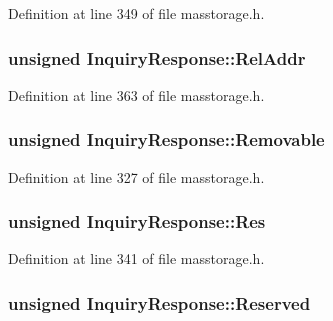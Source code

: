 \-Definition at line 349 of file masstorage.\-h.

\hypertarget{struct_inquiry_response_a64121510090cb38926bbb321e98b1a13}{
\subsubsection[{\-Rel\-Addr}]{\setlength{\rightskip}{0pt plus 5cm}unsigned {\bf \-Inquiry\-Response\-::\-Rel\-Addr}}}\label{struct_inquiry_response_a64121510090cb38926bbb321e98b1a13}


\-Definition at line 363 of file masstorage.\-h.

\hypertarget{struct_inquiry_response_ab6572ef8e5cd457e0699095f6a0c7a3d}{
\subsubsection[{\-Removable}]{\setlength{\rightskip}{0pt plus 5cm}unsigned {\bf \-Inquiry\-Response\-::\-Removable}}}\label{struct_inquiry_response_ab6572ef8e5cd457e0699095f6a0c7a3d}


\-Definition at line 327 of file masstorage.\-h.

\hypertarget{struct_inquiry_response_a9f642c5fccc1c87cf6b444a138b6aa4b}{
\subsubsection[{\-Res}]{\setlength{\rightskip}{0pt plus 5cm}unsigned {\bf \-Inquiry\-Response\-::\-Res}}}\label{struct_inquiry_response_a9f642c5fccc1c87cf6b444a138b6aa4b}


\-Definition at line 341 of file masstorage.\-h.

\hypertarget{struct_inquiry_response_abb4a48d4fc326ad932fb41c82fe289f3}{
\subsubsection[{\-Reserved}]{\setlength{\rightskip}{0pt plus 5cm}unsigned {\bf \-Inquiry\-Response\-::\-Reserved}}}\label{struct_inquiry_response_abb4a48d4fc326ad932fb41c82fe289f3}


